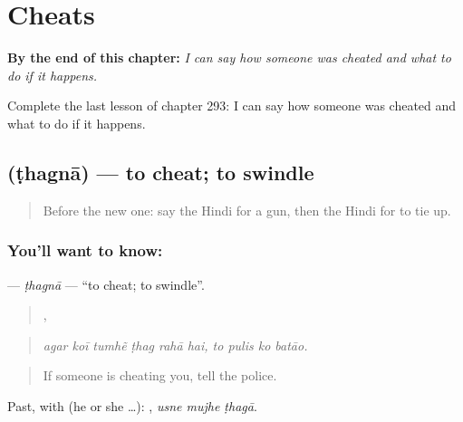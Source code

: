 
\chapter{Cheats}
\label{ch:hi-cheats}

\begin{chapteropening}
\textbf{By the end of this chapter:} \emph{I can say how someone was cheated and what to do if it happens.}

Complete the last lesson of chapter 293: I can say how someone was cheated and what to do if it happens.
\end{chapteropening}

\section[\texorpdfstring{\hi{ठगना} (ṭhagnā)}{ठगना (ṭhagnā)}]{ (ṭhagnā) — to cheat; to swindle}

\label{lesson:HI-C293-thagna}



\begin{quote}
Before the new one: say the Hindi for a gun, then the Hindi for to tie up.
\end{quote}

\subsection*{You'll want to know: }
\textbf{} — \emph{ṭhagnā} — \textquotedblleft{}to cheat; to swindle\textquotedblright{}.

\begin{quote}
     ,    
\end{quote}

\begin{quote}
\emph{agar koī tumhẽ ṭhag rahā hai, to pulis ko batāo.}
\end{quote}

\begin{quote}
If someone is cheating you, tell the police.
\end{quote}

Past, with  (he or she …):   , \emph{usne mujhe ṭhagā}.

